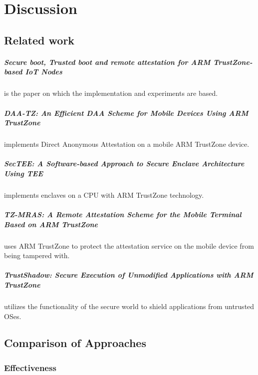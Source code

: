 \documentclass{report}
\begin{document}
\chapter{Discussion}

\section{Related work}

\paragraph*{Secure boot, Trusted boot and remote attestation for ARM TrustZone-based IoT Nodes}
is the paper on which the implementation and experiments are based.

\paragraph*{DAA-TZ: An Efficient DAA Scheme for Mobile Devices Using ARM TrustZone}
implements Direct Anonymous Attestation on a mobile ARM TrustZone device.

\paragraph*{SecTEE: A Software-based Approach to Secure Enclave Architecture Using TEE}
implements enclaves on a CPU with ARM TrustZone technology. 

\paragraph*{TZ-MRAS: A Remote Attestation Scheme for the Mobile Terminal Based on ARM TrustZone}
uses ARM TrustZone to protect the attestation service on the mobile device from being tampered with.

\paragraph*{TrustShadow: Secure Execution of Unmodified Applications with ARM TrustZone}
utilizes the functionality of the secure world to shield applications from untrusted OSes.

\section{Comparison of Approaches}

\subsection*{Effectiveness}
\end{document}
